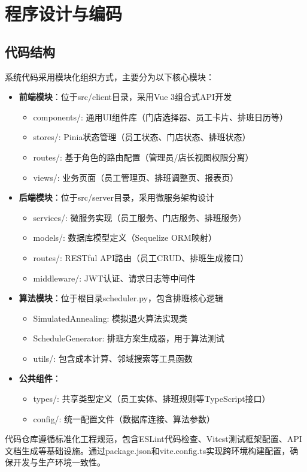\documentclass{ctexart}
\begin{document}
\section{程序设计与编码}
\subsection{代码结构}
系统代码采用模块化组织方式，主要分为以下核心模块：
\begin{itemize}
    \item \textbf{前端模块}：位于src/client目录，采用Vue 3组合式API开发
    \begin{itemize}
        \item components/: 通用UI组件库（门店选择器、员工卡片、排班日历等）
        \item stores/: Pinia状态管理（员工状态、门店状态、排班状态）
        \item routes/: 基于角色的路由配置（管理员/店长视图权限分离）
        \item views/: 业务页面（员工管理页、排班调整页、报表页）
    \end{itemize}

    \item \textbf{后端模块}：位于src/server目录，采用微服务架构设计
    \begin{itemize}
        \item services/: 微服务实现（员工服务、门店服务、排班服务）
        \item models/: 数据库模型定义（Sequelize ORM映射）
        \item routes/: RESTful API路由（员工CRUD、排班生成接口）
        \item middleware/: JWT认证、请求日志等中间件
    \end{itemize}

    \item \textbf{算法模块}：位于根目录scheduler.py，包含排班核心逻辑
    \begin{itemize}
        \item SimulatedAnnealing: 模拟退火算法实现类
        \item ScheduleGenerator: 排班方案生成器，用于算法测试
        \item utils/: 包含成本计算、邻域搜索等工具函数
    \end{itemize}

    \item \textbf{公共组件}：
    \begin{itemize}
        \item types/: 共享类型定义（员工实体、排班规则等TypeScript接口）
        \item config/: 统一配置文件（数据库连接、算法参数）
    \end{itemize}
\end{itemize}
代码仓库遵循标准化工程规范，包含ESLint代码检查、Vitest测试框架配置、API文档生成等基础设施。通过package.json和vite.config.ts实现跨环境构建配置，确保开发与生产环境一致性。
\end{document}
